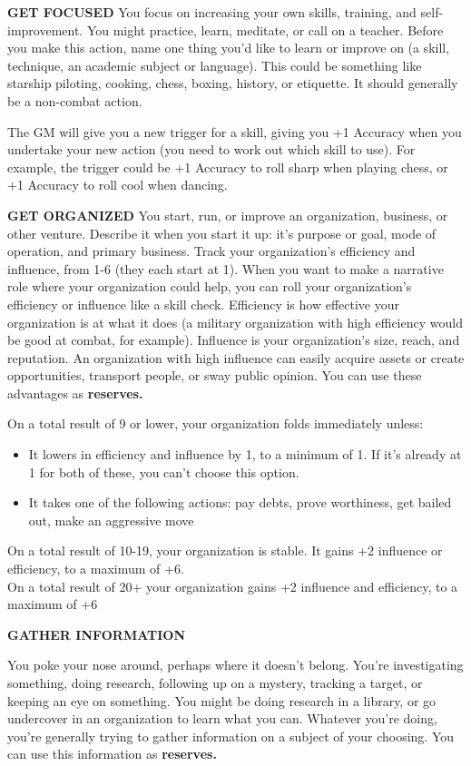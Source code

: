 \textbf{GET FOCUSED}
You focus on increasing your own skills, training, and self-improvement. You might practice, learn, meditate, or call on a teacher. Before you make this action, name one thing you’d like to learn or improve on (a skill, technique, an academic subject or language). This could be something like starship piloting, cooking, chess, boxing, history, or etiquette. It should generally be a non-combat action.

The GM will give you a new trigger for a skill, giving you +1 Accuracy when you undertake your new action (you need to work out which skill to use). For example, the trigger could be +1 Accuracy to roll sharp when playing chess, or +1 Accuracy to roll cool when dancing.

\textbf{GET ORGANIZED}
You start, run, or improve an organization, business, or other venture. Describe it when you start it up: it’s purpose or goal, mode of operation, and primary business. Track your organization’s efficiency and influence, from 1-6 (they each start at 1). When you want to make a narrative role where your organization could help, you can roll your organization’s efficiency or influence like a skill check. Efficiency is how effective your organization is at what it does (a military organization with high efficiency would be good at combat, for example). Influence is your organization’s size, reach, and reputation. An organization with high influence can easily acquire assets or create opportunities, transport people, or sway public opinion. You can use these advantages as \textbf{reserves.} 

On a total result of 9 or lower, your organization folds immediately unless:
\begin{itemize}
\item It lowers in efficiency and influence by 1, to a minimum of 1. If it’s already at 1 for both of these, you can’t choose this option.
\item It takes one of the following actions: pay debts, prove worthiness, get bailed out, make an aggressive move
\end{itemize}  
On a total result of 10-19, your organization is stable. It gains +2 influence or efficiency, to a maximum of +6.\\
On a total result of 20+ your organization gains +2 influence and efficiency, to a maximum of +6

\textbf{GATHER INFORMATION}

You poke your nose around, perhaps where it doesn’t belong. You’re investigating something, doing research, following up on a mystery, tracking a target, or keeping an eye on something. You might be doing research in a library, or go undercover in an organization to learn what you can. Whatever you’re doing, you’re generally trying to gather information on a subject of your choosing. You can use this information as \textbf{reserves.} 

